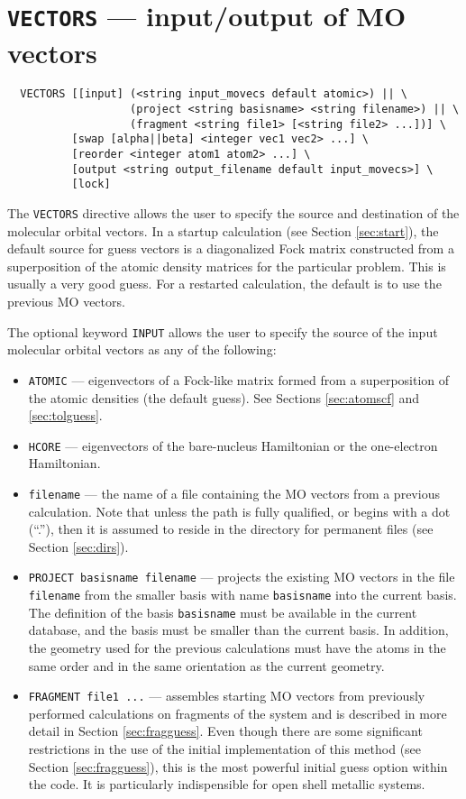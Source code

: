 \section{{\tt VECTORS} --- input/output of MO vectors}
\label{sec:vectors}


\begin{verbatim}
  VECTORS [[input] (<string input_movecs default atomic>) || \
                   (project <string basisname> <string filename>) || \
                   (fragment <string file1> [<string file2> ...])] \
          [swap [alpha||beta] <integer vec1 vec2> ...] \
          [reorder <integer atom1 atom2> ...] \
          [output <string output_filename default input_movecs>] \
          [lock]
\end{verbatim}

The \verb+VECTORS+ directive allows the user to specify the source and
destination of the molecular orbital vectors.  In a startup
calculation (see Section \ref{sec:start}), the default source for
guess vectors is a diagonalized Fock matrix constructed from a
superposition of the atomic density matrices for the particular
problem.  This is usually a very good guess.  For a restarted 
calculation, the default is to use the previous MO vectors.

The optional keyword \verb+INPUT+ allows the user to specify the
source of the input molecular orbital vectors as any of the following:
\begin{itemize}
\item \verb+ATOMIC+ --- eigenvectors of a Fock-like matrix formed from
  a superposition of the atomic densities (the default guess).  See
  Sections \ref{sec:atomscf} and \ref{sec:tolguess}.  
\item \verb+HCORE+ --- eigenvectors of the bare-nucleus Hamiltonian or
  the one-electron Hamiltonian.
\item \verb+filename+ --- the name of a file containing the MO vectors
  from a previous calculation.  Note that unless the path is fully
  qualified, or begins with a dot (``.''), then it is assumed to
  reside in the directory for permanent files (see Section
  \ref{sec:dirs}).
\item \verb+PROJECT basisname filename+ --- projects the existing MO
  vectors in the file \verb+filename+ from the smaller basis with name
  \verb+basisname+ into the current basis.  The definition of the
  basis \verb+basisname+ must be available in the current database,
  and the basis must be smaller than the current basis.  In addition,
  the geometry used for the previous calculations must have the atoms
  in the same order and in the same orientation as the current
  geometry.
\item \verb+FRAGMENT file1 ...+ --- assembles starting MO vectors from
  previously performed calculations on fragments of the system and is
  described in more detail in Section \ref{sec:fragguess}.  Even
  though there are some significant restrictions in the use of the
  initial implementation of this method (see Section
  \ref{sec:fragguess}), this is the most powerful initial guess option
  within the code.  It is particularly indispensible for open shell
  metallic systems.
\end{itemize}
 
